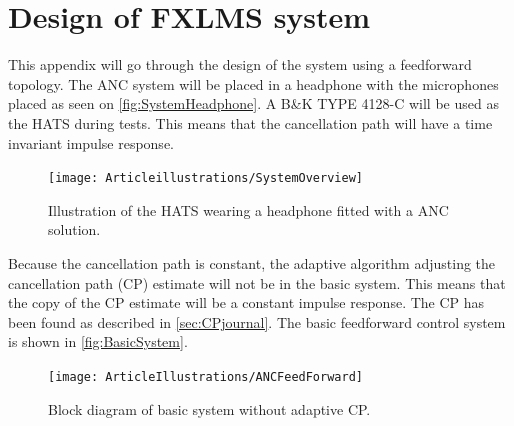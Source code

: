 \section{Design of FXLMS system} \label{sec:systemDesign}
This appendix will go through the design of the system using a feedforward topology. The ANC system will be placed in a headphone with the microphones placed as seen on \autoref{fig:SystemHeadphone}. A B\&K TYPE 4128-C will be used as the HATS during tests. This means that the cancellation path will have a time invariant impulse response. 


\begin{figure}[H]
	\centering
	\texttt{[image: Articleillustrations/SystemOverview]}
	\caption{Illustration of the HATS wearing a headphone fitted with a ANC solution.}
	\label{fig:SystemHeadphone}
\end{figure}  

Because the cancellation path is constant, the adaptive algorithm adjusting the cancellation path (CP) estimate will not be in the basic system. This means that the copy of the CP estimate will be a constant impulse response. The CP has been found as described in \autoref{sec:CPjournal}. The basic feedforward control system is shown in \autoref{fig:BasicSystem}. 

\begin{figure}[H]
	\centering
	\texttt{[image: ArticleIllustrations/ANCFeedForward]}
	\caption{Block diagram of basic system without adaptive CP.}
	\label{fig:BasicSystem}
\end{figure}   




